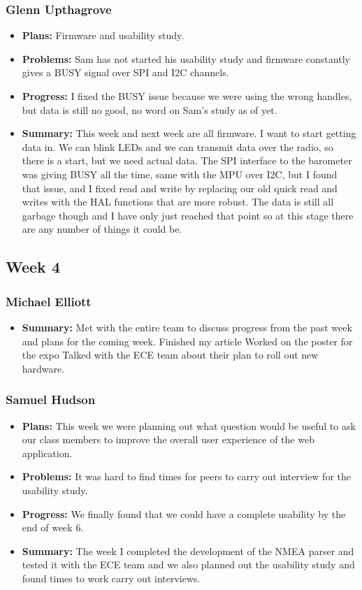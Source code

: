 \documentclass[onecolumn, draftclsnofoot,10pt, compsoc]{IEEEtran}
\begin{document}
\subsubsection{Glenn Upthagrove}
\begin {itemize}
 \item \textbf{Plans: }Firmware and usability study.  
 \item \textbf{Problems: }Sam has not started his usability study and firmware constantly gives a BUSY signal over SPI and I2C channels.  
 \item \textbf{Progress: }I fixed the BUSY issue because we were using the wrong handles, but data is still no good, no word on Sam's study as of yet.  
 \item \textbf{Summary: }This week and next week are all firmware. I want to start getting data in. We can blink LEDs and we can transmit data over the radio, so there is a start, but we need actual data. The SPI interface to the barometer was giving BUSY all the time, same with the MPU over I2C, but I found that issue, and I fixed read and write by replacing our old quick read and writes with the HAL functions that are more robust. The data is still all garbage though and I have only just reached that point so at this stage there are any number of things it could be.   
\end {itemize}

\subsection{Week 4}
\subsubsection{Michael Elliott}
\begin {itemize}
 \item \textbf{Summary: }Met with the entire team to discuss progress from the past week and
plans for the coming week.
Finished my article
Worked on the poster for the expo
Talked with the ECE team about their plan to roll out new hardware.
\end{itemize}
\subsubsection{Samuel Hudson}
\begin {itemize}
 \item \textbf{Plans: }This week we were planning out what question would be useful to ask our class members to improve the overall user experience of the web application. 
 \item \textbf{Problems: }It was hard to find times for peers to carry out interview for the usability study. 
 \item \textbf{Progress: }We finally found that we could have a complete usability by the end of week 6.
 \item \textbf{Summary: }The week I completed the development of the NMEA parser and tested it with the ECE team and we also planned out the usability study and found times to work carry out interviews.
\end {itemize}
\end{document}
